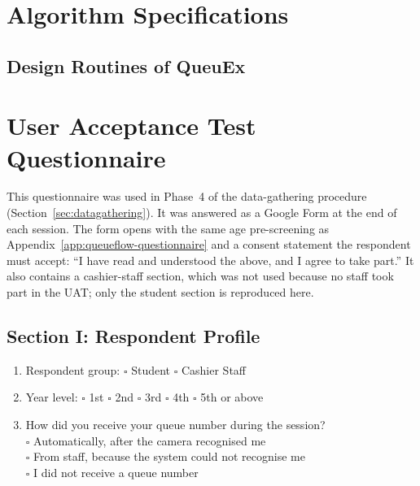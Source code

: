 \documentclass{research}
\newcommand{\sysname}{QueuEx}
\begin{document}
\chapter{Algorithm Specifications}
\label{app:algorithms}

\section{Design Routines of \sysname{}}


\chapter{User Acceptance Test Questionnaire}
\label{app:uat}

This questionnaire was used in Phase~4 of the data-gathering procedure
(Section~\ref{sec:datagathering}). It was answered as a Google Form at
the end of each session.
The form opens with the same age pre-screening as
Appendix~\ref{app:queueflow-questionnaire} and a consent statement the
respondent must accept: ``I have read and understood the above, and I
agree to take part.'' It also contains a cashier-staff section, which
was not used because no staff took part in the UAT; only the student
section is reproduced here.

\section*{Section I: Respondent Profile}

\begin{enumerate}
  \setlength{\itemsep}{1pt}
  \item Respondent group:
        $\square$ Student \quad
        $\square$ Cashier Staff
  \item Year level:
        $\square$ 1st \quad
        $\square$ 2nd \quad
        $\square$ 3rd \quad
        $\square$ 4th \quad
        $\square$ 5th or above
  \item How did you receive your queue number during the session?\\
        $\square$ Automatically, after the camera recognised me\\
        $\square$ From staff, because the system could not recognise me\\
        $\square$ I did not receive a queue number
\end{enumerate}
\end{document}
